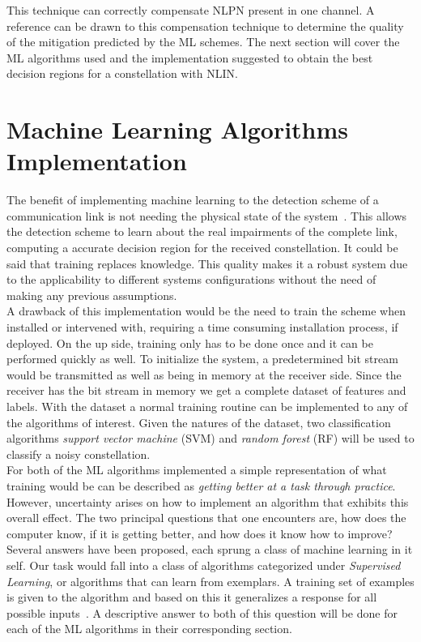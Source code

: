 This technique  can correctly compensate NLPN present in one channel. A reference can be drawn to this compensation technique to determine the quality of the mitigation predicted by the ML schemes. The next section will cover the ML algorithms used and the implementation suggested to obtain the best decision regions for a constellation with NLIN. 
\section{Machine Learning Algorithms Implementation  }

The benefit of implementing machine learning to the detection scheme of a communication link is not needing the physical state of the system~\cite{zibar2015application}. This allows the detection scheme to learn about the real impairments of the complete link, computing a accurate decision region for the received constellation. It could be said that training replaces knowledge. This quality makes it a robust system due to the applicability to different systems configurations without the need of making any previous assumptions.~\\

 A drawback of this implementation would be the need to train the scheme when installed or intervened with, requiring a time consuming installation process, if deployed. On the up side, training only has to be done once and it can be performed quickly as well. To initialize the system, a predetermined bit stream would be transmitted as well as being in memory at the receiver side. Since the receiver has the bit stream in memory we get a complete dataset of features and labels. With the dataset a normal training routine can be implemented to any of the algorithms of interest. Given the natures of the dataset, two classification algorithms \textit{support vector machine} (SVM) and \textit{random forest} (RF) will be used to classify a noisy constellation.~\\  


For both of the ML algorithms implemented a simple representation of what training would be can be described as \emph{getting better at a task through practice}. However, uncertainty arises on how to implement an algorithm that exhibits this overall effect. The two principal questions that one encounters are, how does the computer know, if it is getting better, and how does it know how to improve?  Several answers have been proposed, each sprung a class of machine learning in it self. Our task would fall into a class of algorithms categorized under \textit{Supervised Learning}, or algorithms that can learn from exemplars. A training set of examples is given to the algorithm and based on this it generalizes a response for all possible inputs~\cite{marsland2014machine}. A descriptive answer to both of this question will be done for each of the ML algorithms in their corresponding section.





